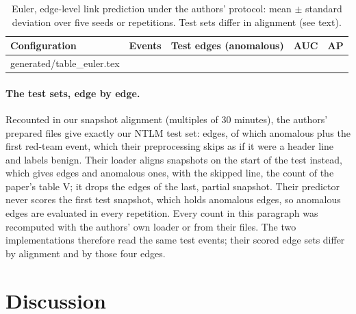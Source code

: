\documentclass[11pt,a4paper]{article}
\makeatletter
\newcommand{\tablerows}[1]{\@@input #1 }
\makeatother
\begin{document}
\begin{table}[t]
\centering
\footnotesize
\begin{threeparttable}
\caption{Euler, edge-level link prediction under the authors' protocol: mean $\pm$ standard deviation over five seeds or repetitions. Test sets differ in alignment (see text).}
\label{tab:euler}
\setlength{\tabcolsep}{3pt}
\begin{tabular}{@{}L{4.1cm}rlll@{}}
\toprule
Configuration & Events & Test edges (anomalous) & AUC & AP \\
\midrule
\tablerows{generated/table_euler.tex}
\bottomrule
\end{tabular}
\end{threeparttable}
\end{table}

\paragraph{The test sets, edge by edge.} Recounted in our snapshot alignment (multiples of 30 minutes), the authors' prepared files give exactly our NTLM test set: \EulerTestEdges{} edges, of which \EulerOurAlignmentAnomalous{} anomalous plus the first red-team event, which their preprocessing skips as if it were a header line and labels benign. Their loader aligns snapshots on the start of the test instead, which gives \EulerTheirAlignmentEdges{} edges and \EulerTheirAnomalous{} anomalous ones, \EulerPublishedAnomalous{} with the skipped line, the count of the paper's table V; it drops the \EulerTheirLastSnapshot{} edges of the last, partial snapshot. Their predictor never scores the first test snapshot, which holds \EulerAuthorsFirstSnapshot{} anomalous edges, so \EulerAuthorsEvaluated{} anomalous edges are evaluated in every repetition. Every count in this paragraph was recomputed with the authors' own loader or from their files. The two implementations therefore read the same test events; their scored edge sets differ by alignment and by those four edges.

\section{Discussion}
\label{sec:discussion}
\end{document}

